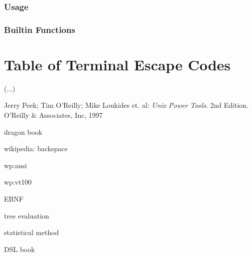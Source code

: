 \documentclass[paper=a4,abstract=on,cleardoublepage=empty,numbers=noenddot,toc=bib]{scrreprt}
\begin{document}
\subsection{Usage}

\subsection{Builtin Functions}


\chapter{Table of Terminal Escape Codes}

(...)

\begin{thebibliography}{99}
    \bibitem{}
        Jerry Peek; Tim O'Reilly; Mike Loukides et. al: \emph{Unix Power Tools}. 2nd Edition. O'Reilly \& Associates, Inc, 1997

    \bibitem{}
        dragon book

    \bibitem{}
        wikipedia: backspace

    \bibitem{}
        wp:ansi

    \bibitem{}
        wp:vt100

    \bibitem{}
        EBNF

    \bibitem{}
        tree evaluation

    \bibitem{}
        statistical method

    \bibitem{}
        DSL book
\end{thebibliography}
\end{document}
